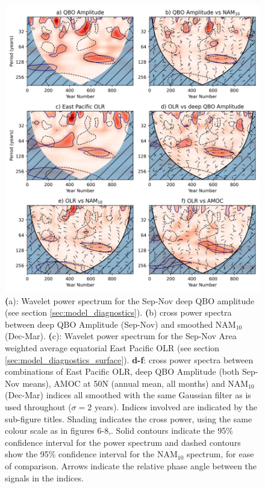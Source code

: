 \begin{figure}[h!]
\begin{center}
\noindent\includegraphics[width = 0.7\linewidth]{Figures/Figures-surface/OLR_wavelet.png}
\caption[Wavelet power spectra for the NAM$_{10}$, deep QBO amplitude and associated surface metrics]{\textbf(a): Wavelet power spectrum for the Sep-Nov deep QBO amplitude (see section \ref{sec:model_diagnostics}). \textbf(b) cross power spectra between deep QBO Amplitude (Sep-Nov) and smoothed NAM$_{10}$ (Dec-Mar). \textbf(c): Wavelet power spectrum for the Sep-Nov  Area weighted average equatorial East Pacific OLR (see section \ref{sec:model_diagnostics_surface}). \textbf{d-f}: cross power spectra between combinations of East Pacific OLR, deep QBO Amplitude (both Sep-Nov means), AMOC at 50N (annual mean, all months) and NAM$_{10}$ (Dec-Mar) indices all smoothed with the same Gaussian filter as is used throughout ($\sigma = 2$ years). Indices involved are indicated by the sub-figure titles. Shading indicates the cross power, using the same colour scale as in figures 6-8,. Solid contours indicate the 95\% confidence interval for the power spectrum and dashed contours show the 95\% confidence interval for the NAM$_{10}$ spectrum, for ease of comparison. Arrows  indicate the relative phase angle between the signals in the indices.}
\label{OLR_wavelet}
\end{center}
\end{figure}

